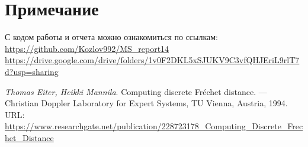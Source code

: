\documentclass[a4paper]{article}
\begin{document}
\section*{Примечание}
С кодом работы и отчета можно ознакомиться по ссылкам:\\\url{https://github.com/Kozlov992/MS_report14}\\
\url{https://drive.google.com/drive/folders/1v0F2DKL5xSJUKV9C3vfQHJEriL9rlT7d?usp=sharing}
\begin{thebibliography}{9}
\textit{Thomas Eiter, Heikki Mannila}. Computing discrete Fréchet distance. — Christian Doppler Laboratory for Expert Systems, TU Vienna, Austria, 1994.  URL: \url{https://www.researchgate.net/publication/228723178_Computing_Discrete_Frechet_Distance}
\end{thebibliography}
\end{document}
